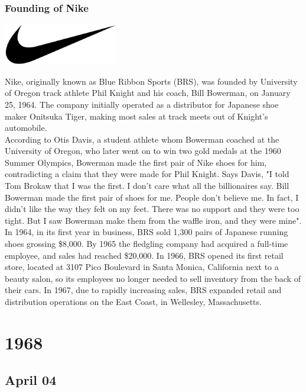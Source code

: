 \documentclass[11pt]{report}
\begin{document}
\subsection{Founding of Nike}
\vspace{2mm}\begin{center}\includegraphics[width=5cm]{./img/nikeLogo.jpg}\end{center}
Nike, originally known as Blue Ribbon Sports (BRS), was founded by University of Oregon track athlete Phil Knight and his coach, Bill Bowerman, on January 25, 1964. The company initially operated as a distributor for Japanese shoe maker Onitsuka Tiger, making most sales at track meets out of Knight's automobile.\\ \indent According to Otis Davis, a student athlete whom Bowerman coached at the University of Oregon, who later went on to win two gold medals at the 1960 Summer Olympics, Bowerman made the first pair of Nike shoes for him, contradicting a claim that they were made for Phil Knight. Says Davis, "I told Tom Brokaw that I was the first. I don't care what all the billionaires say. Bill Bowerman made the first pair of shoes for me. People don't believe me. In fact, I didn't like the way they felt on my feet. There was no support and they were too tight. But I saw Bowerman make them from the waffle iron, and they were mine".\\ \indent In 1964, in its first year in business, BRS sold 1,300 pairs of Japanese running shoes grossing \$8,000. By 1965 the fledgling company had acquired a full-time employee, and sales had reached \$20,000. In 1966, BRS opened its first retail store, located at 3107 Pico Boulevard in Santa Monica, California next to a beauty salon, so its employees no longer needed to sell inventory from the back of their cars. In 1967, due to rapidly increasing sales, BRS expanded retail and distribution operations on the East Coast, in Wellesley, Massachusetts.

\chapter{1968}
\section{April 04}
\end{document}
